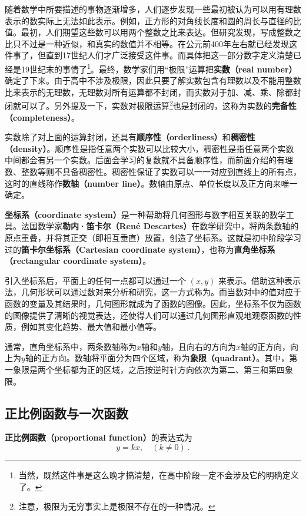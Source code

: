 随着数学中所要描述的事物逐渐增多，人们逐步发现一些最初被认为可以用有理数表示的数实际上无法如此表示。例如，正方形的对角线长度和圆的周长与直径的比值。最初，人们期望这些数可以用两个整数之比来表达。但研究发现，写成整数之比只不过是一种近似，和真实的数值并不相等。在公元前400年左右就已经发现这件事了，但直到17世纪人们才广泛接受这件事。而具体把这一部分数字定义清楚已经是19世纪末的事情了\footnote{当然，既然这件事是这么晚才搞清楚，在高中阶段一定不会涉及它的明确定义了。}。最终，数学家们用“极限”运算把\textbf{实数（real number）}确定了下来。由于高中不涉及极限，因此只要了解实数包含有理数以及不能用整数比来表示的无理数，无理数对所有运算都不封闭，而实数对于加、减、乘、除都封闭就可以了。另外提及一下，实数对极限运算\footnote{注意，极限为无穷事实上是极限不存在的一种情况。}也是封闭的，这称为实数的\textbf{完备性（completeness）}。

实数除了对上面的运算封闭，还具有\textbf{顺序性（orderliness）}和\textbf{稠密性（density）}。顺序性是指任意两个实数可以比较大小，稠密性是指任意两个实数中间都会有另一个实数。后面会学习的复数就不具备顺序性，而前面介绍的有理数、整数等则不具备稠密性。稠密性保证了实数可以一一对应到直线上的所有点，这时的直线称作\textbf{数轴（number line）}。数轴由原点、单位长度以及正方向来唯一确定。

\textbf{坐标系（coordinate system）}是一种帮助将几何图形与数字相互关联的数学工具。法国数学家\textbf{勒内·笛卡尔（René Descartes）}在数学研究中，将两条数轴的原点重叠，并将其正交（即相互垂直）放置，创造了坐标系。这就是初中阶段学习过的\textbf{笛卡尔坐标系（Cartesian coordinate system）}，也称为\textbf{直角坐标系（rectangular coordinate system）}。

引入坐标系后，平面上的任何一点都可以通过一个 $(x, y)$ 来表示。借助这种表示法，几何形状可以通过数对来分析和研究，这一方式称为。而当数对中的值对应于函数的变量及其结果时，几何图形就成为了函数的图像。因此，坐标系不仅为函数的图像提供了清晰的视觉表达，还使得人们可以通过几何图形直观地观察函数的性质，例如其变化趋势、最大值和最小值等。

通常，直角坐标系中，两条数轴称为$x$轴和$y$轴，且向右的方向为$x$轴的正方向，向上为$y$轴的正方向。数轴将平面分为四个区域，称为\textbf{象限（quadrant）}。其中，第一象限是两个坐标都为正的区域，之后按逆时针方向依次为第二、第三和第四象限。

\subsection{正比例函数与一次函数}


\textbf{正比例函数（proportional function）}的表达式为 
\begin{equation}
y = kx,\quad(k\neq0)~.
\end{equation}

